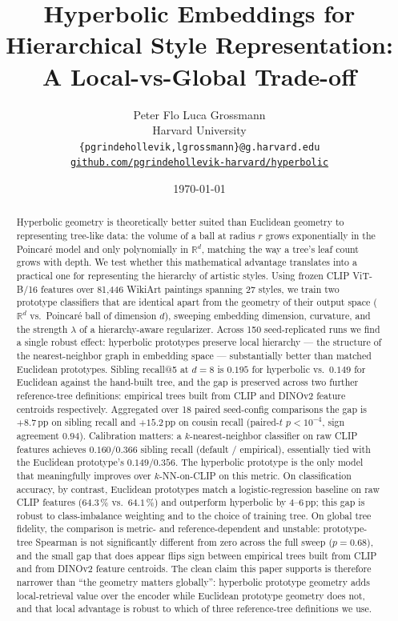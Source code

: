 \documentclass[11pt]{article}
\title{\Large\textbf{Hyperbolic Embeddings for Hierarchical Style Representation:\\[0.15em]
  A Local-vs-Global Trade-off}}
\author{%
  Peter Flo \quad Luca Grossmann \\[0.3em]
  Harvard University\\
  \texttt{\{pgrindehollevik,lgrossmann\}@g.harvard.edu}\\[0.6em]
  \href{https://github.com/pgrindehollevik-harvard/hyperbolic}{%
    \nolinkurl{github.com/pgrindehollevik-harvard/hyperbolic}}
}
\date{\today}
\begin{document}
\maketitle

\begin{abstract}
Hyperbolic geometry is theoretically better suited than Euclidean
geometry to representing tree-like data: the volume of a ball at
radius $r$ grows exponentially in the Poincar\'e model and only
polynomially in $\mathbb{R}^d$, matching the way a tree's leaf count
grows with depth. We test whether this mathematical advantage
translates into a practical one for representing the hierarchy of
artistic styles. Using frozen CLIP ViT-B/16 features over 81{,}446
WikiArt paintings spanning 27 styles, we train two prototype
classifiers that are identical apart from the geometry of their
output space ($\mathbb{R}^d$ vs.\ Poincar\'e ball of dimension $d$),
sweeping embedding dimension, curvature, and the strength $\lambda$
of a hierarchy-aware regularizer. Across 150 seed-replicated runs we
find a single robust effect: hyperbolic prototypes preserve local
hierarchy --- the structure of the nearest-neighbor graph in
embedding space --- substantially better than matched Euclidean
prototypes. Sibling recall@5 at $d{=}8$ is $0.195$ for hyperbolic
vs.\ $0.149$ for Euclidean against the hand-built tree, and the gap
is preserved across two further reference-tree definitions:
empirical trees built from CLIP and DINOv2 feature centroids
respectively. Aggregated over 18 paired seed-config
comparisons the gap is $+8.7$\,pp on sibling recall and $+15.2$\,pp
on cousin recall (paired-$t$ $p<10^{-4}$, sign agreement $0.94$).
Calibration matters: a $k$-nearest-neighbor classifier on raw CLIP
features achieves $0.160 / 0.366$ sibling recall (default /
empirical), essentially tied with the Euclidean prototype's
$0.149 / 0.356$. The hyperbolic prototype is the only model that
meaningfully improves over $k$-NN-on-CLIP on this metric. On
classification accuracy, by contrast, Euclidean prototypes match a
logistic-regression baseline on raw CLIP features ($64.3$\,\% vs.\
$64.1$\,\%) and outperform hyperbolic by $4$--$6$\,pp; this gap is
robust to class-imbalance weighting and to the choice of training
tree. On global tree fidelity, the comparison is metric- and
reference-dependent and unstable: prototype-tree Spearman is not
significantly different from zero across the full sweep ($p=0.68$),
and the small gap that does appear flips sign between empirical
trees built from CLIP and from DINOv2 feature centroids. The clean
claim this paper supports is therefore narrower than ``the geometry
matters globally'': hyperbolic prototype geometry adds
local-retrieval value over the encoder while Euclidean prototype
geometry does not, and that local advantage is robust to which of
three reference-tree definitions we use.
\end{abstract}
\end{document}
